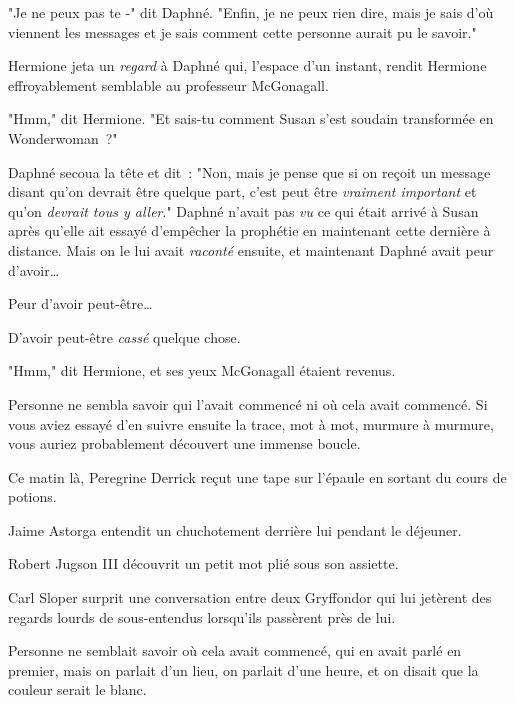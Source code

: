 "Je ne peux pas te -" dit Daphné. "Enfin, je ne peux rien dire, mais je sais d'où viennent les messages et je sais comment cette personne aurait pu le savoir."

Hermione jeta un \emph{regard} à Daphné qui, l'espace d'un instant, rendit Hermione effroyablement semblable au professeur McGonagall.

"Hmm," dit Hermione. "Et sais-tu comment Susan s'est soudain transformée en Wonderwoman~?"

Daphné secoua la tête et dit~: "Non, mais je pense que si on reçoit un message disant qu'on devrait être quelque part, c'est peut être \emph{vraiment important} et qu'on \emph{devrait tous y aller}." Daphné n'avait pas \emph{vu} ce qui était arrivé à Susan après qu'elle ait essayé d'empêcher la prophétie en maintenant cette dernière à distance. Mais on le lui avait \emph{raconté} ensuite, et maintenant Daphné avait peur d'avoir…

Peur d'avoir peut-être…

D'avoir peut-être \emph{cassé} quelque chose.

"Hmm," dit Hermione, et ses yeux McGonagall étaient revenus.

\later

Personne ne sembla savoir qui l'avait commencé ni où cela avait commencé. Si vous aviez essayé d'en suivre ensuite la trace, mot à mot, murmure à murmure, vous auriez probablement découvert une immense boucle.

Ce matin là, Peregrine Derrick reçut une tape sur l'épaule en sortant du cours de potions.

Jaime Astorga entendit un chuchotement derrière lui pendant le déjeuner.

Robert Jugson III découvrit un petit mot plié sous son assiette.

Carl Sloper surprit une conversation entre deux Gryffondor qui lui jetèrent des regards lourds de sous-entendus lorsqu'ils passèrent près de lui.

Personne ne semblait savoir où cela avait commencé, qui en avait parlé en premier, mais on parlait d'un lieu, on parlait d'une heure, et on disait que la couleur serait le blanc.

\later

